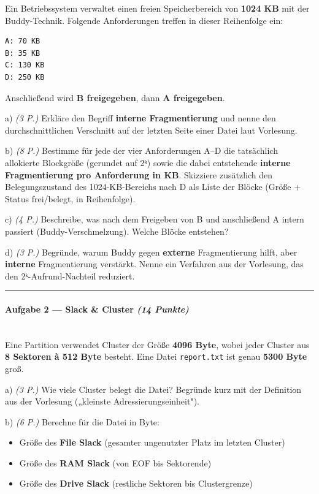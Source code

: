 \documentclass[11pt, a4paper]{article}
\begin{document}
Ein Betriebssystem verwaltet einen freien Speicherbereich von \textbf{1024 KB} mit der Buddy-Technik. Folgende Anforderungen treffen in dieser Reihenfolge ein:


\begin{lstlisting}
A: 70 KB
B: 35 KB
C: 130 KB
D: 250 KB
\end{lstlisting}


Anschließend wird \textbf{B freigegeben}, dann \textbf{A freigegeben}.


a) \textit{(3 P.)} Erkläre den Begriff \textbf{interne Fragmentierung} und nenne den durchschnittlichen Verschnitt auf der letzten Seite einer Datei laut Vorlesung.


b) \textit{(8 P.)} Bestimme für jede der vier Anforderungen A–D die tatsächlich allokierte Blockgröße (gerundet auf 2ᵏ) sowie die dabei entstehende \textbf{interne Fragmentierung pro Anforderung in KB}. Skizziere zusätzlich den Belegungszustand des 1024-KB-Bereichs nach D als Liste der Blöcke (Größe + Status frei/belegt, in Reihenfolge).


c) \textit{(4 P.)} Beschreibe, was nach dem Freigeben von B und anschließend A intern passiert (Buddy-Verschmelzung). Welche Blöcke entstehen?


d) \textit{(3 P.)} Begründe, warum Buddy gegen \textbf{externe} Fragmentierung hilft, aber \textbf{interne} Fragmentierung verstärkt. Nenne ein Verfahren aus der Vorlesung, das den 2ᵏ-Aufrund-Nachteil reduziert.



\noindent\textcolor{rulegray}{\rule{\linewidth}{0.4pt}}


\paragraph{Aufgabe 2 — Slack \& Cluster \textit{(14 Punkte)}}\mbox{}\\[2pt]

Eine Partition verwendet Cluster der Größe \textbf{4096 Byte}, wobei jeder Cluster aus \textbf{8 Sektoren à 512 Byte} besteht. Eine Datei \texttt{report.txt} ist genau \textbf{5300 Byte} groß.


a) \textit{(3 P.)} Wie viele Cluster belegt die Datei? Begründe kurz mit der Definition aus der Vorlesung („kleinste Adressierungseinheit").


b) \textit{(6 P.)} Berechne für die Datei in Byte:

\begin{itemize}
  \item Größe des \textbf{File Slack} (gesamter ungenutzter Platz im letzten Cluster)
  \item Größe des \textbf{RAM Slack} (von EOF bis Sektorende)
  \item Größe des \textbf{Drive Slack} (restliche Sektoren bis Clustergrenze)
\end{itemize}
\end{document}
